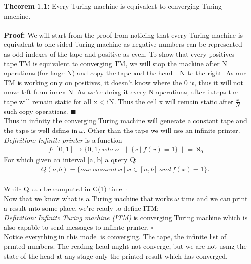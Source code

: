 \documentclass{article}
\begin{document}
	
	\textbf{Theorem 1.1:} Every Turing machine is equivalent to converging Turing machine. \\ \\
	\textbf{Proof:}
	We will start from the proof from noticing that every Turing machine is equivalent to one sided Turing machine as negative numbers can be represented as odd indexes of the tape and positive as even. To show that every positives tape TM is equivalent to converging TM, we will stop the machine after N operations (for large N) and copy the tape and the head +N to the right. As our TM is working only on positives, it doesn't know where the 0 is, thus it will not move left from index N. As we're doing it every N operations, after i steps the tape will remain static for all x < iN. Thus the cell x will remain static after {\Large$\frac{x}{N}$} such copy operations. $\blacksquare$\\
	
	Thus in infinity the converging Turing machine will generate a constant tape and the tape is well define in $\omega$. Other than the tape we will use an infinite printer. \\
	
\textit{Definition: Infinite printer} is a function 	
	\begin{align*}
f:[0,1] \to \{0,1\} \  where \ \  
\|\{x\ | \ f(x) = 1\}\| = \aleph_0
\end{align*}
For which given an interval [a, b] a query Q: 
	\begin{align*}
	Q(a, b) = \{one \ element \ x\ | \ x \in [a, b] \ and \ f(x) = 1\}. \ \ 
	\end{align*}\\ While Q can be computed in O(1) time $\square$\\
	
Now that we know what is a Turing machine that works $\omega$ time and we can print a result into some place, we're ready to define ITM: \\
	
\textit{Definition: Infinite Turing machine (ITM)} is converging Turing machine which is also capable to send messages to infinite printer. $\square$ \\

Notice everything in this model is converging. The tape, the infinite list of printed numbers. The reading head might not converge, but we are not using the state of the head at any stage only the printed result which has converged. \\
\end{document}
